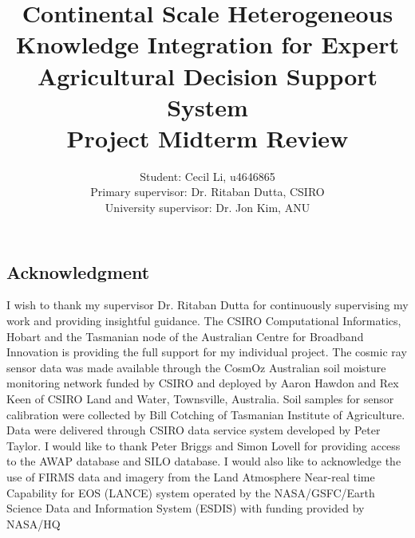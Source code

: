 \documentclass[12pt,journal,compsoc,onecolumn]{IEEEtran}
\begin{document}
\title{Continental Scale Heterogeneous Knowledge Integration for Expert Agricultural Decision Support System\\ \vspace{1cm} Project Midterm Review}
\author{Student: Cecil Li, u4646865\\Primary supervisor: Dr. Ritaban Dutta, CSIRO\\ University supervisor: Dr. Jon Kim, ANU}

\maketitle

\newpage
\vspace*{\fill}
\begin{center}
\section*{Acknowledgment}
\end{center}
\begin{adjustwidth}{2cm}{2cm}
I wish to thank my supervisor Dr. Ritaban Dutta for continuously supervising my work and providing insightful guidance. The CSIRO Computational Informatics, Hobart and the Tasmanian node of the Australian Centre for Broadband Innovation is providing the full support for my individual project. The
cosmic ray sensor data was made available through the CosmOz
Australian soil moisture monitoring network funded by CSIRO
and deployed by Aaron Hawdon and Rex Keen of CSIRO Land
and Water, Townsville, Australia. Soil samples for sensor
calibration were collected by Bill Cotching of Tasmanian
Institute of Agriculture. Data were delivered through CSIRO
data service system developed by Peter Taylor. I would
like to thank Peter Briggs and Simon Lovell for providing access
to the AWAP database and SILO database. I would also like to acknowledge the use of FIRMS data and imagery from the Land Atmosphere Near-real time Capability for EOS (LANCE) system operated by the NASA/GSFC/Earth Science Data and Information System (ESDIS) with funding provided by NASA/HQ
\end{adjustwidth}
\vspace*{\fill}
\newpage
\end{document}
